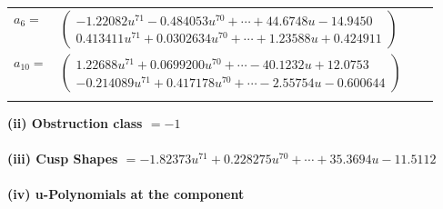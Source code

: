 \documentclass[1p]{elsarticle_modified}
\theoremstyle{definition}
\begin{document}
\begin{tabular}{m{7pt} m{180pt} m{7pt} m{180pt} }
\flushright $a_{6}=$&$\begin{pmatrix}-1.22082 u^{71}-0.484053 u^{70}+\cdots+44.6748 u-14.9450\\0.413411 u^{71}+0.0302634 u^{70}+\cdots+1.23588 u+0.424911\end{pmatrix}$ \\
\flushright $a_{10}=$&$\begin{pmatrix}1.22688 u^{71}+0.0699200 u^{70}+\cdots-40.1232 u+12.0753\\-0.214089 u^{71}+0.417178 u^{70}+\cdots-2.55754 u-0.600644\end{pmatrix}$\\&\end{tabular}
\flushleft \textbf{(ii) Obstruction class $= -1$}\\~\\
\flushleft \textbf{(iii) Cusp Shapes $= -1.82373 u^{71}+0.228275 u^{70}+\cdots+35.3694 u-11.5112$}\\~\\
\newpage\renewcommand{\arraystretch}{1}
\flushleft \textbf{(iv) u-Polynomials at the component}\newline \\
\end{document}
